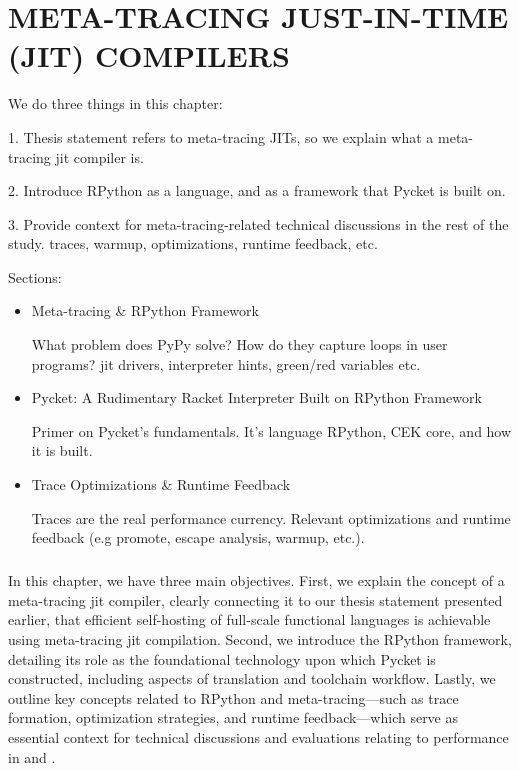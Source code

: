 \chapter[\texorpdfstring{META-TRACING JUST-IN-TIME (JIT) COMPILERS}
                          {2. RPython \& Meta-tracing}]{META-TRACING JUST-IN-TIME (JIT) COMPILERS}
    \label{chapter:rpython}

    \begin{chaptersynopsis}

        We do three things in this chapter:

        1. Thesis statement refers to meta-tracing JITs, so we explain what a meta-tracing \gls{jit} compiler is.

        2. Introduce RPython as a language, and as a framework that Pycket is built on.

        3. Provide context for meta-tracing-related technical discussions in the rest of the study. traces, warmup, optimizations, runtime feedback, etc.

        \vspace{2em}

        Sections:
		\begin{itemize}
			\item Meta-tracing \& RPython Framework

                What problem does PyPy solve? How do they capture loops in user programs? \gls{jit} drivers, interpreter hints, green/red variables etc.
			\item Pycket: A Rudimentary Racket Interpreter Built on RPython Framework

                Primer on Pycket's fundamentals. It's language RPython, CEK core, and how it is built.
			\item Trace Optimizations \& Runtime Feedback

                Traces are the real performance currency. Relevant optimizations and runtime feedback (e.g promote, escape analysis, warmup, etc.).
		\end{itemize}
    \end{chaptersynopsis}

    \paragraph{}%
        In this chapter, we have three main objectives. First, we explain the concept of a meta-tracing \gls{jit} compiler, clearly connecting it to our thesis statement presented earlier, that efficient self-hosting of full-scale functional languages is achievable using meta-tracing \gls{jit} compilation. Second, we introduce the RPython framework, detailing its role as the foundational technology upon which Pycket is constructed, including aspects of translation and toolchain workflow. Lastly, we outline key concepts related to RPython and meta-tracing—such as trace formation, optimization strategies, and runtime feedback—which serve as essential context for technical discussions and evaluations relating to performance in  and .

